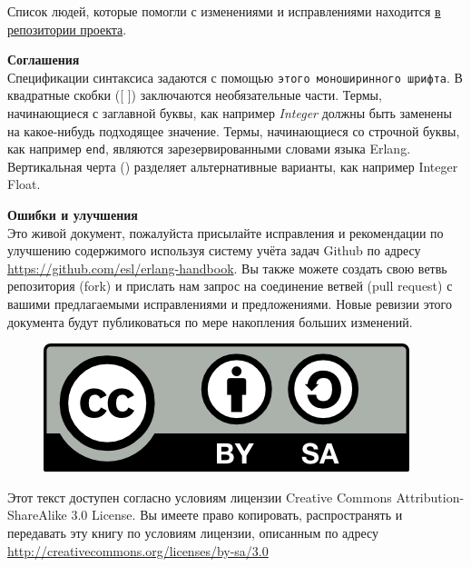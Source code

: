 \documentclass[russian,14pt,oneside]{book}
\begin{document}
Список людей, которые помогли с изменениями и исправлениями находится
\href{https://github.com/esl/erlang-handbook/graphs/contributors}{в репозитории 
проекта}.

\vspace{10pt}
\textbf{Соглашения}\\
Спецификации синтаксиса задаются с помощью \texttt{этого моноширинного шрифта}.
В квадратные скобки ([ ]) заключаются необязательные части. Термы, начинающиеся
с заглавной буквы, как например \textit{Integer} должны быть заменены на 
какое-нибудь подходящее значение. Термы, начинающиеся со строчной буквы, как
например \texttt{end}, являются зарезервированными словами языка Erlang. 
Вертикальная черта (\textbar{}) разделяет альтернативные варианты, как например 
Integer \textbar{} Float.

\vspace{10pt}
\textbf{Ошибки и улучшения}\\
Это живой документ, пожалуйста присылайте исправления и рекомендации по улучшению
содержимого используя систему учёта задач Github по адресу
\url{https://github.com/esl/erlang-handbook}. Вы также можете создать свою ветвь
репозитория (fork) и прислать нам запрос на соединение ветвей (pull request) с
вашими предлагаемыми исправлениями и предложениями. Новые ревизии этого документа
будут публиковаться по мере накопления больших изменений.

\vspace{10pt}
\begin{figure}
	\vspace{-12pt}
	\includegraphics[scale=0.7]{includes/cc-by-sa.png}
	\vspace{-12pt}
\end{figure}
Этот текст доступен согласно условиям лицензии Creative Commons
Attribution-ShareAlike 3.0 License. Вы имеете право копировать, распространять и
передавать эту книгу по условиям лицензии,  описанным по адресу
\url{http://creativecommons.org/licenses/by-sa/3.0}

\newpage


\tableofcontents















\end{document}
